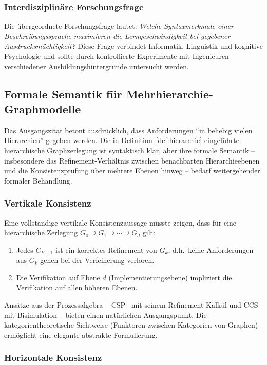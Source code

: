 ﻿\documentclass[a4paper,12pt]{article}
\theoremstyle{definition}
\begin{document}
\subsubsection{Interdisziplinäre Forschungsfrage}

Die übergeordnete Forschungsfrage lautet: \emph{Welche Syntaxmerkmale einer
Beschreibungssprache maximieren die Lerngeschwindigkeit bei gegebener
Ausdrucksmächtigkeit?} Diese Frage verbindet Informatik, Linguistik und kognitive
Psychologie und sollte durch kontrollierte Experimente mit Ingenieuren verschiedener
Ausbildungshintergründe untersucht werden.

\subsection{Formale Semantik für Mehrhierarchie-Graphmodelle}

Das Ausgangszitat betont ausdrücklich, dass Anforderungen \enquote{in beliebig vielen
Hierarchien} gegeben werden. Die in Definition~\ref{def:hierarchie} eingeführte
hierarchische Graphzerlegung ist syntaktisch klar, aber ihre formale Semantik --
insbesondere das Refinement-Verhältnis zwischen benachbarten Hierarchieebenen und
die Konsistenzprüfung über mehrere Ebenen hinweg -- bedarf weitergehender formaler
Behandlung.

\subsubsection{Vertikale Konsistenz}

Eine vollständige vertikale Konsistenzaussage müsste zeigen, dass für eine hierarchische
Zerlegung $G_0 \supseteq G_1 \supseteq \cdots \supseteq G_d$ gilt:
\begin{enumerate}
  \item Jedes $G_{k+1}$ ist ein korrektes Refinement von $G_k$, d.h.\ keine Anforderungen
        aus $G_k$ gehen bei der Verfeinerung verloren.
  \item Die Verifikation auf Ebene $d$ (Implementierungsebene) impliziert die Verifikation
        auf allen höheren Ebenen.
\end{enumerate}
Ansätze aus der Prozessalgebra -- CSP~\cite{hoare1978} mit seinem Refinement-Kalkül
und CCS~\cite{milner1980} mit Bisimulation -- bieten einen natürlichen Ausgangspunkt.
Die kategorientheoretische Sichtweise (Funktoren zwischen Kategorien von Graphen)
ermöglicht eine elegante abstrakte Formulierung.

\subsubsection{Horizontale Konsistenz}
\end{document}
